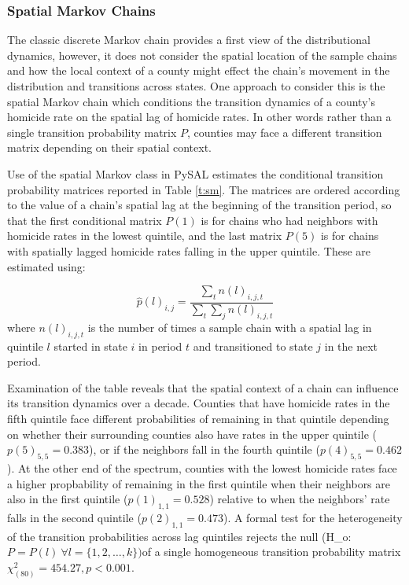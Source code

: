 \documentclass[11pt, titlepage]{article}
\begin{document}
\subsubsection{Spatial Markov Chains}

The classic discrete Markov chain provides a first view of the
distributional dynamics, however, it does not consider the spatial
location of the sample chains and how the local context of a county
might effect the chain's movement in the distribution and transitions
across states. One approach to consider this is the spatial Markov chain
which conditions the transition dynamics of a county's homicide rate on
the spatial lag of homicide rates. In other words rather than a single
transition probability matrix $P$, counties may face a different
transition matrix depending on their spatial context.

Use of the spatial Markov class in PySAL estimates the conditional
transition probability matrices reported in Table \ref{t:sm}. The matrices are
ordered according to the value of a chain's spatial lag at the beginning
of the transition period, so that the first conditional matrix $P(1)$ is
for chains who had neighbors with homicide rates in the lowest quintile,
and the last matrix $P(5)$ is for chains with spatially lagged homicide
rates falling in the upper quintile. These are estimated using:

\begin{equation}
\hat{p}(l)_{i,j} = \frac{\sum_t n(l)_{i,j,t}}{\sum_t \sum_j n(l)_{i,j,t}} 
\label{e:cm}
\end{equation}
where $n(l)_{i,j,t}$ is the number of times a sample chain with a
spatial lag in quintile $l$ started in state $i$
in period $t$ and transitioned to state $j$ in the next period.

Examination of the table reveals that the spatial context of a chain can
influence its transition dynamics over a decade. Counties that have
homicide rates in the fifth quintile face different probabilities of
remaining in that quintile depending on whether their surrounding
counties also have rates in the upper quintile ($p(5)_{5,5} = 0.383$),
or if the neighbors fall in the fourth quintile ($p(4)_{5,5}=0.462$). At
the other end of the spectrum, counties with the lowest homicide rates
face a higher propbability of remaining in the first quintile when their
neighbors are also in the first quintile ($p(1)_{1,1}=0.528$) relative
to when the neighbors' rate falls in the second quintile
($p(2)_{1,1}=0.473$). A formal test for the heterogeneity of the
transition probabilities across lag quintiles rejects the null (H\_o:
$P=P(l) \ \forall l=\{1,2,\ldots,k\})$of a single homogeneous transition
probability matrix $\chi_{(80)}^2=454.27, p<0.001$.
\end{document}
